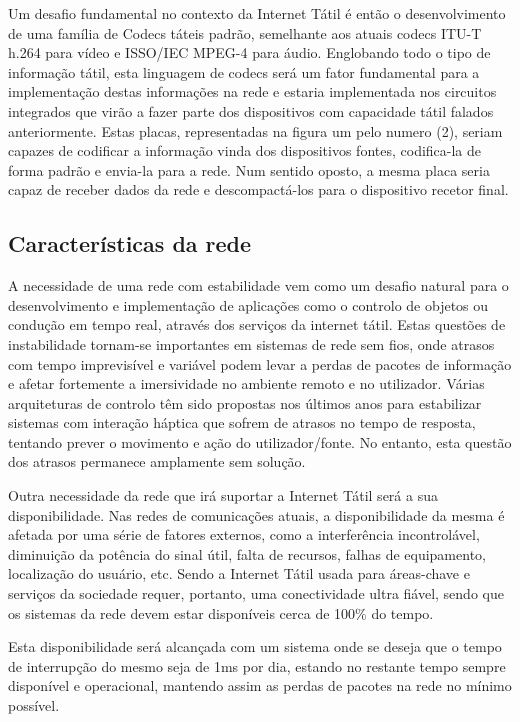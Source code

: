 \documentclass{llncs}
\begin{document}
Um desafio fundamental no contexto da Internet Tátil é então o desenvolvimento de uma família de Codecs táteis padrão, semelhante aos atuais codecs ITU-T h.264 para vídeo e ISSO/IEC MPEG-4 para áudio. Englobando todo o tipo de informação tátil, esta linguagem de codecs será um fator fundamental para a implementação destas informações na rede e estaria implementada nos circuitos integrados que virão a fazer parte dos dispositivos com capacidade tátil falados anteriormente. Estas placas, representadas na figura um pelo numero (2), seriam capazes de codificar a informação vinda dos dispositivos fontes, codifica-la de forma padrão e envia-la para a rede. Num sentido oposto, a mesma placa seria capaz de receber dados da rede e descompactá-los para o dispositivo recetor final.


\subsection{Características da rede}
\setlength{\parindent}{0.5cm}
A necessidade de uma rede com estabilidade vem como um desafio natural para o desenvolvimento e implementação de aplicações como o controlo de objetos ou condução em tempo real, através dos serviços da internet tátil. Estas questões de instabilidade tornam-se importantes em sistemas de rede sem fios, onde atrasos com tempo imprevisível e variável podem levar a perdas de pacotes de informação e afetar fortemente a imersividade no ambiente remoto e no utilizador. Várias arquiteturas de controlo têm sido propostas nos últimos anos para estabilizar sistemas com interação háptica que sofrem de atrasos no tempo de resposta, tentando prever o movimento e ação do utilizador/fonte. No entanto, esta questão dos atrasos permanece amplamente sem solução.

Outra necessidade da rede que irá suportar a Internet Tátil será a sua disponibilidade. Nas redes de comunicações atuais, a disponibilidade da mesma é afetada por uma série de fatores externos, como a interferência incontrolável, diminuição da potência do sinal útil, falta de recursos, falhas de equipamento, localização do usuário, etc. Sendo a Internet Tátil usada para áreas-chave e serviços da sociedade requer, portanto, uma conectividade ultra fiável, sendo que os sistemas da rede devem estar disponíveis cerca de 100\% do tempo.

Esta disponibilidade será alcançada com um sistema onde se deseja que o tempo de interrupção do mesmo seja de 1ms por dia, estando no restante tempo sempre disponível e operacional, mantendo assim as perdas de pacotes na rede no mínimo possível.
\end{document}
